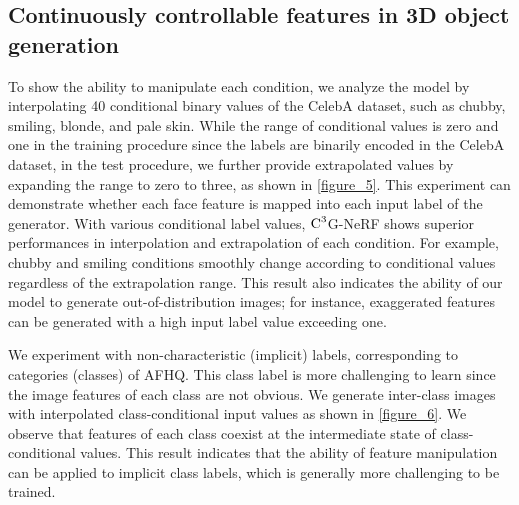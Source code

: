 \documentclass[nohyperref]{article}
\theoremstyle{plain}
\theoremstyle{definition}
\theoremstyle{remark}
\begin{document}
\subsection{Continuously controllable features in 3D object generation}
To show the ability to manipulate each condition, we analyze the model by interpolating 40 conditional binary values of the CelebA dataset, such as chubby, smiling, blonde, and pale skin. While the range of conditional values is zero and one in the training procedure since the labels are binarily encoded in the CelebA dataset, in the test procedure, we further provide extrapolated values by expanding the range to zero to three, as shown in \cref{figure_5}. This experiment can demonstrate whether each face feature is mapped into each input label of the generator. With various conditional label values, $\textnormal{C}^{3}$G-NeRF shows superior performances in interpolation \cite{davis1975interpolation} and extrapolation \cite{brezinski2013extrapolation} of each condition. For example, chubby and smiling conditions \cite{liu2015deep} smoothly change according to conditional values regardless of the extrapolation range. This result also indicates the ability of our model to generate out-of-distribution images; for instance, exaggerated features can be generated with a high input label value exceeding one. 


\begin{figure*}[h!]
\begin{center}
\vskip -0.15in
\caption{\textbf{Class interpolation on conditional input values with the AFHQ dataset.} Each row and column represent the same latent vectors (identical object) and the same class-conditional values, respectively. By interpolating the values of each class, features of each category coexist at the intermediate state of class-conditional values.}
\label{figure_6}
\end{center}
\vskip -0.2in
\end{figure*}


We experiment with non-characteristic (implicit) labels, corresponding to categories (classes) of AFHQ. This class label is more challenging to learn since the image features of each class are not obvious. We generate inter-class images with interpolated class-conditional input values as shown in \cref{figure_6}. We observe that features of each class coexist at the intermediate state of class-conditional values. This result indicates that the ability of feature manipulation can be applied to implicit class labels, which is generally more challenging to be trained.
\end{document}
